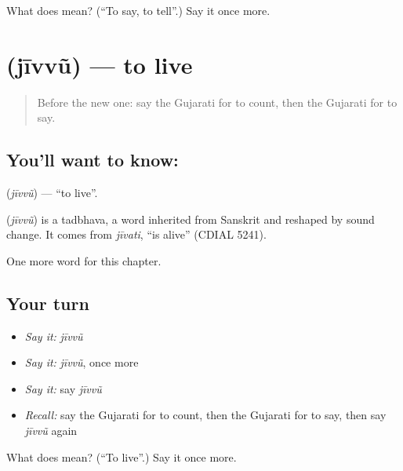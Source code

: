 \begin{tcolorbox}[breakable,colback=teal!4,colframe=teal!35!black,title={Before you move on}]
What does  mean? (\textquotedblleft{}To say, to tell\textquotedblright{}.) Say it once more.
\end{tcolorbox}
\section[\texorpdfstring{\gu{જીવવું} (jīvvũ)}{જીવવું (jīvvũ)}]{ (jīvvũ) — to live}

\label{lesson:GU-C142-jivvu}



\begin{quote}
Before the new one: say the Gujarati for to count, then the Gujarati for to say.
\end{quote}

\subsection*{You'll want to know: }
\textbf{} (\emph{jīvvũ}) — \textquotedblleft{}to live\textquotedblright{}.

\begin{cousinweb}
\textbf{} (\emph{jīvvũ}) is a tadbhava, a word inherited from Sanskrit and reshaped by sound change. It comes from \emph{jīvati}, \textquotedblleft{}is alive\textquotedblright{} (CDIAL 5241).
\end{cousinweb}

\begin{grammarlens}[title={What you've built}]
One more word for this chapter.
\end{grammarlens}

\subsection*{Your turn}
\begin{itemize}
\raggedright
  \item \emph{Say it:} \emph{jīvvũ}
  \item \emph{Say it:} \emph{jīvvũ}, once more
  \item \emph{Say it:} say \emph{jīvvũ}
  \item \emph{Recall:} say the Gujarati for to count, then the Gujarati for to say, then say \emph{jīvvũ} again
\end{itemize}

\begin{tcolorbox}[breakable,colback=teal!4,colframe=teal!35!black,title={Before you move on}]
What does  mean? (\textquotedblleft{}To live\textquotedblright{}.) Say it once more.
\end{tcolorbox}
